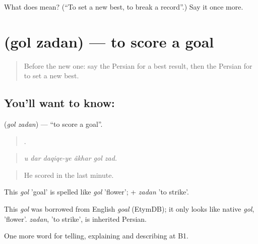 \begin{tcolorbox}[breakable,colback=teal!4,colframe=teal!35!black,title={Before you move on}]
What does   mean? (\textquotedblleft{}To set a new best, to break a record\textquotedblright{}.) Say it once more.
\end{tcolorbox}
\section[\texorpdfstring{\fa{گل} \fa{زدن} (gol zadan)}{گل زدن (gol zadan)}]{  (gol zadan) — to score a goal}

\label{lesson:FA-C513-gol-zadan}



\begin{quote}
Before the new one: say the Persian for a best result, then the Persian for to set a new best.
\end{quote}

\subsection*{You'll want to know:  }
\textbf{ } (\emph{gol zadan}) — \textquotedblleft{}to score a goal\textquotedblright{}.

\begin{quote}
     .
\end{quote}

\begin{quote}
\emph{u dar daqiqe-ye âkhar gol zad.}
\end{quote}

\begin{quote}
He scored in the last minute.
\end{quote}

This \emph{gol} 'goal' is spelled like \emph{gol} 'flower'; + \emph{zadan} 'to strike'.

\begin{cousinweb}
This \emph{gol} was borrowed from English \emph{goal} (EtymDB); it only looks like native \emph{gol}, 'flower'. \emph{zadan}, 'to strike', is inherited Persian.
\end{cousinweb}

\begin{grammarlens}[title={What you've built}]
One more word for telling, explaining and describing at B1.
\end{grammarlens}

